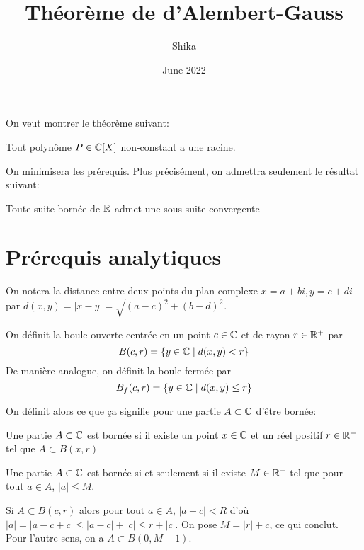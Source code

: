 \documentclass{article}
\title{Théorème de d'Alembert-Gauss}
\author{Shika}
\date{June 2022}
\begin{document}
\maketitle

On veut montrer le théorème suivant:

\begin{theoreme}
    Tout polynôme $P \in \mathbb{C}[X]$ non-constant a une racine.
\end{theoreme}

On minimisera les prérequis. Plus précisément, on admettra seulement le résultat suivant:

\begin{theoreme}
    Toute suite bornée de $\mathbb{R}$ admet une sous-suite convergente
\end{theoreme}

\section{Prérequis analytiques}
On notera la distance entre deux points du plan complexe $x = a+bi, y = c+di$ par $d(x, y) = |x-y| = \sqrt{(a-c)^2 + (b-d)^2}$.

\begin{definition}
    On définit la boule ouverte centrée en un point $c \in \mathbb{C}$ et de rayon $r \in \mathbb{R}^+$ par
    $$B(c, r) = \{y \in \mathbb{C} \mid d(x, y) < r\}$$
    De manière analogue, on définit la boule fermée par
    $$B_f(c, r) = \{y \in \mathbb{C} \mid d(x, y) \leq r\}$$
\end{definition}
On définit alors ce que ça signifie pour une partie $A \subset \mathbb{C}$ d'être bornée:
\begin{definition}
    Une partie $A \subset \mathbb{C}$ est bornée si il existe un point $x \in \mathbb{C}$ et un réel positif $r \in \mathbb{R}^+$ tel que $A \subset B(x, r)$
\end{definition}

\begin{proposition}
    Une partie $A \subset \mathbb{C}$ est bornée si et seulement si il existe $M \in \mathbb{R}^+$ tel que pour tout $a \in A$, $|a| \leq M$.
\end{proposition}

\begin{preuve}
    Si $A \subset B(c, r)$ alors pour tout $a \in A$, $|a - c| < R$ d'où $|a| = |a-c + c| \leq |a-c| + |c| \leq r + |c|$. On pose $M = |r| + c$, ce qui conclut.\\
    Pour l'autre sens, on a $A \subset B(0, M + 1)$.\\
\end{preuve}
\end{document}
